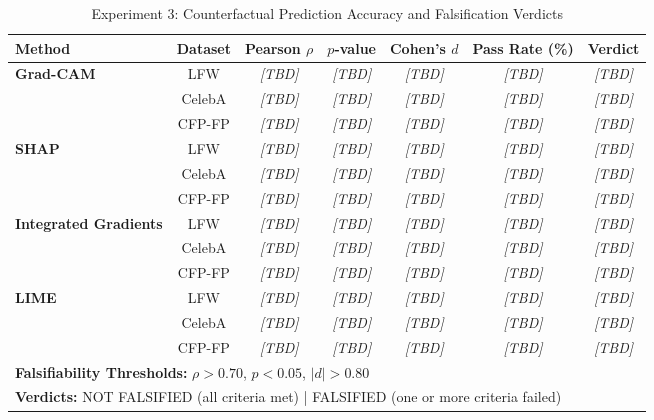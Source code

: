 
\begin{table}[htbp]
\centering
\caption{Experiment 3: Counterfactual Prediction Accuracy and Falsification Verdicts}
\label{tab:counterfactual_prediction}
\small
\begin{tabularx}{\textwidth}{lcccccc}
\toprule
\textbf{Method} & \textbf{Dataset} & \textbf{Pearson $\rho$} & \textbf{$p$-value} & \textbf{Cohen's $d$} & \textbf{Pass Rate (\%)} & \textbf{Verdict} \\
\midrule
\multirow{3}{*}{\textbf{Grad-CAM}} & LFW & \textit{[TBD]} & \textit{[TBD]} & \textit{[TBD]} & \textit{[TBD]} & \textit{[TBD]} \\
& CelebA & \textit{[TBD]} & \textit{[TBD]} & \textit{[TBD]} & \textit{[TBD]} & \textit{[TBD]} \\
& CFP-FP & \textit{[TBD]} & \textit{[TBD]} & \textit{[TBD]} & \textit{[TBD]} & \textit{[TBD]} \\[4pt]

\multirow{3}{*}{\textbf{SHAP}} & LFW & \textit{[TBD]} & \textit{[TBD]} & \textit{[TBD]} & \textit{[TBD]} & \textit{[TBD]} \\
& CelebA & \textit{[TBD]} & \textit{[TBD]} & \textit{[TBD]} & \textit{[TBD]} & \textit{[TBD]} \\
& CFP-FP & \textit{[TBD]} & \textit{[TBD]} & \textit{[TBD]} & \textit{[TBD]} & \textit{[TBD]} \\[4pt]

\multirow{3}{*}{\textbf{Integrated Gradients}} & LFW & \textit{[TBD]} & \textit{[TBD]} & \textit{[TBD]} & \textit{[TBD]} & \textit{[TBD]} \\
& CelebA & \textit{[TBD]} & \textit{[TBD]} & \textit{[TBD]} & \textit{[TBD]} & \textit{[TBD]} \\
& CFP-FP & \textit{[TBD]} & \textit{[TBD]} & \textit{[TBD]} & \textit{[TBD]} & \textit{[TBD]} \\[4pt]

\multirow{3}{*}{\textbf{LIME}} & LFW & \textit{[TBD]} & \textit{[TBD]} & \textit{[TBD]} & \textit{[TBD]} & \textit{[TBD]} \\
& CelebA & \textit{[TBD]} & \textit{[TBD]} & \textit{[TBD]} & \textit{[TBD]} & \textit{[TBD]} \\
& CFP-FP & \textit{[TBD]} & \textit{[TBD]} & \textit{[TBD]} & \textit{[TBD]} & \textit{[TBD]} \\

\midrule
\multicolumn{7}{l}{\textbf{Falsifiability Thresholds:} $\rho > 0.70$, $p < 0.05$, $|d| > 0.80$} \\
\multicolumn{7}{l}{\textbf{Verdicts:} NOT FALSIFIED (all criteria met) | FALSIFIED (one or more criteria failed)} \\
\bottomrule
\end{tabularx}
\end{table}

